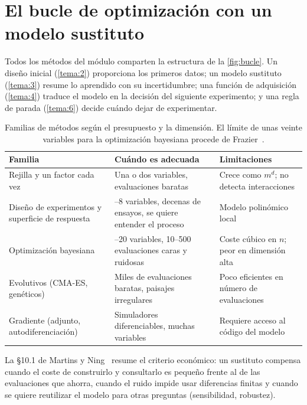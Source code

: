 \section{El bucle de optimización con un modelo sustituto}

Todos los métodos del módulo comparten la estructura de la \cref{fig:bucle}. Un diseño inicial (\cref{tema:2}) proporciona los primeros datos; un modelo sustituto (\cref{tema:3}) resume lo aprendido con su incertidumbre; una función de adquisición (\cref{tema:4}) traduce el modelo en la decisión del siguiente experimento; y una regla de parada (\cref{tema:6}) decide cuándo dejar de experimentar.

\addtocounter{figure}{1}%

\begin{table}[ht]
\centering\small
\begin{tabularx}{\textwidth}{@{}>{\raggedright\arraybackslash}p{2.9cm}>{\raggedright\arraybackslash}X>{\raggedright\arraybackslash}p{3.6cm}@{}}
\toprule
Familia & Cuándo es adecuada & Limitaciones \\
\midrule
Rejilla y un factor cada vez & Una o dos variables, evaluaciones baratas & Crece como $m^{d}$; no detecta interacciones \\
Diseño de experimentos y superficie de respuesta & 2–8 variables, decenas de ensayos, se quiere entender el proceso & Modelo polinómico local \\
Optimización bayesiana & 1–20 variables, 10–500 evaluaciones caras y ruidosas & Coste cúbico en $n$; peor en dimensión alta \\
Evolutivos (CMA-ES, genéticos) & Miles de evaluaciones baratas, paisajes irregulares & Poco eficientes en número de evaluaciones \\
Gradiente (adjunto, autodiferenciación) & Simuladores diferenciables, muchas variables & Requiere acceso al código del modelo \\
\bottomrule
\end{tabularx}
\caption{Familias de métodos según el presupuesto y la dimensión. El límite de unas veinte variables para la optimización bayesiana procede de Frazier~\cite[§1]{frazier}.}
\label{tab:familias}
\end{table}

La §10.1 de Martins y Ning~\cite{mn} resume el criterio económico: un sustituto compensa cuando el coste de construirlo y consultarlo es pequeño frente al de las evaluaciones que ahorra, cuando el ruido impide usar diferencias finitas y cuando se quiere reutilizar el modelo para otras preguntas (sensibilidad, robustez).

